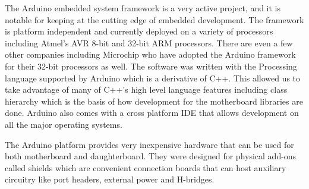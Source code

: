 The Arduino embedded system framework is a very active project, and it is notable for keeping at the cutting edge of embedded development. The framework is platform independent and currently deployed on a variety of processors including Atmel's AVR 8-bit and 32-bit ARM processors. There are even a few other companies including Microchip who have adopted the Arduino framework for their 32-bit processors as well\parencite{Development2012}. 
The \xten software was written with the Processing language supported by Arduino which is a derivative of C++. This allowed us to take advantage of many of C++'s high level language features including class hierarchy which is the basis of how development for the motherboard libraries are done. Arduino also comes with a cross platform IDE that allows development on all the major operating systems.

The Arduino platform provides very inexpensive hardware that can be used for both motherboard and daughterboard. They were designed for physical add-ons called shields which are convenient connection boards that can host auxiliary circuitry like port headers, external power and H-bridges.


